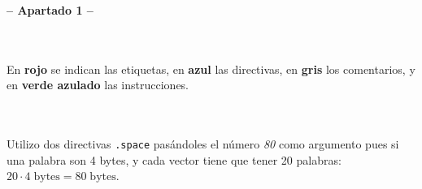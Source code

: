 \documentclass[a4paper]{report}
\begin{document}
\begin{center}
    \Large\textbf{-- Apartado 1 --}
\end{center}

\section{}

\inputminted{mips}{src/problemas/1.asm}

En \textcolor{autumn-red-pyg}{\textbf{rojo}} se indican las etiquetas, en \textcolor{autumn-blue-pyg}{\textbf{azul}} las directivas, en \textcolor{autumn-gray-pyg}{\textbf{gris}} los comentarios, y en \textcolor{autumn-teal-pyg}{\textbf{verde azulado}} las instrucciones.

\section{}

\inputminted{mips}{src/problemas/2.asm}

Utilizo dos directivas \texttt{.space} pasándoles el número \textit{80} como argumento pues si una palabra son 4 bytes, y cada vector tiene que tener 20 palabras: $20 \cdot 4\;\text{bytes} = 80\;\text{bytes}$.

\section{}

\inputminted{mips}{src/problemas/3.asm}


\section{}

\inputminted{mips}{src/problemas/4.asm}


\section{}

\inputminted[breaklines, breakbytokenanywhere]{mips}{src/problemas/5.asm}


\section{}

\inputminted{mips}{src/problemas/6.asm}
\end{document}
